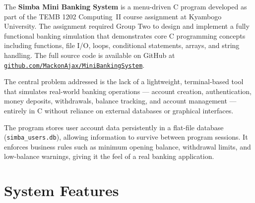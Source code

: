 \documentclass[12pt, a4paper]{article}
\begin{document}
The \textbf{Simba Mini Banking System} is a menu-driven C program developed as part of
the TEMB 1202 Computing~II course assignment at Kyambogo University. The assignment
required Group Two to design and implement a fully functional banking simulation that
demonstrates core C programming concepts including functions, file I/O, loops, conditional
statements, arrays, and string handling. The full source code is available on GitHub at
\href{https://github.com/MackonAjax/MiniBankingSystem/blob/main/main.c}{\texttt{github.com/MackonAjax/MiniBankingSystem}}.

The central problem addressed is the lack of a lightweight, terminal-based tool that
simulates real-world banking operations — account creation, authentication, money
deposits, withdrawals, balance tracking, and account management — entirely in C without
reliance on external databases or graphical interfaces.

The program stores user account data persistently in a flat-file database
(\texttt{simba\_users.db}), allowing information to survive between program sessions. It
enforces business rules such as minimum opening balance, withdrawal limits, and
low-balance warnings, giving it the feel of a real banking application.

\section{System Features}
\end{document}
